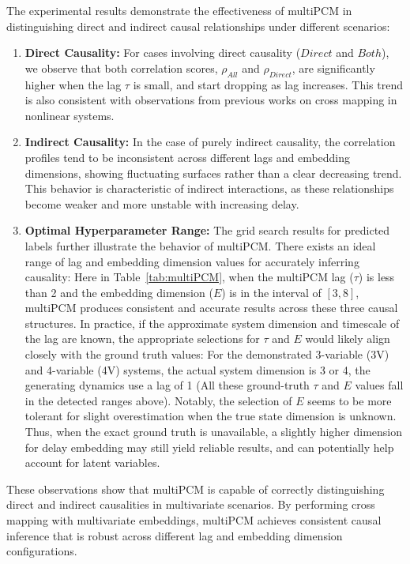 The experimental results demonstrate the effectiveness of multiPCM in distinguishing direct and indirect causal relationships under different scenarios:
\begin{enumerate}
    \item \textbf{Direct Causality:} For cases involving direct causality ($Direct$ and $Both$), we observe that both correlation scores, $\rho_{All}$ and $\rho_{Direct}$, are significantly higher when the lag $\tau$ is small, and start dropping as lag increases. This trend is also consistent with observations from previous works on cross mapping in nonlinear systems.
    \item \textbf{Indirect Causality:} In the case of purely indirect causality, the correlation profiles tend to be inconsistent across different lags and embedding dimensions, showing fluctuating surfaces rather than a clear decreasing trend. This behavior is characteristic of indirect interactions, as these relationships become weaker and more unstable with increasing delay.
    \item \textbf{Optimal Hyperparameter Range:} 
    The grid search results for predicted labels further illustrate the behavior of multiPCM. There exists an ideal range of lag and embedding dimension values for accurately inferring causality: Here in Table~\ref{tab:multiPCM}, when the multiPCM lag ($\tau$) is less than 2 and the embedding dimension ($E$) is in the interval of $[3, 8]$, multiPCM produces consistent and accurate results across these three causal structures. In practice, if the approximate system dimension and timescale of the lag are known, the appropriate selections for $\tau$ and $E$ would likely align closely with the ground truth values: For the demonstrated 3-variable (3V) and 4-variable (4V) systems, the actual system dimension is 3 or 4, the generating dynamics use a lag of 1 (All these ground-truth $\tau$ and $E$ values fall in the detected ranges above). Notably, the selection of $E$ seems to be more tolerant for slight overestimation when the true state dimension is unknown. Thus, when the exact ground truth is unavailable, a slightly higher dimension for delay embedding may still yield reliable results, and can potentially help account for latent variables.
\end{enumerate}

These observations show that multiPCM is capable of correctly distinguishing direct and indirect causalities in multivariate scenarios. By performing cross mapping with multivariate embeddings, multiPCM achieves consistent causal inference that is robust across different lag and embedding dimension configurations.



